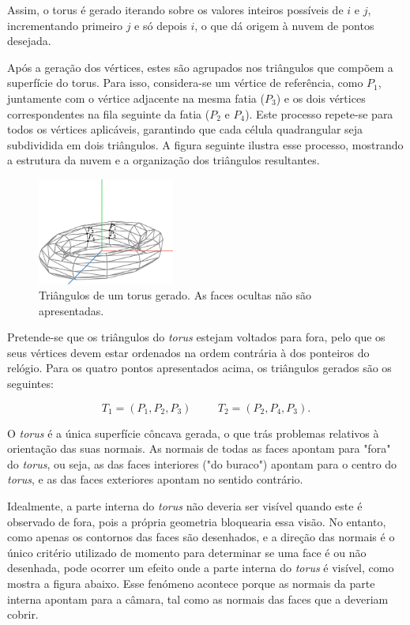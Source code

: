 \documentclass[12pt, a4paper]{article}
\begin{document}
Assim, o torus é gerado iterando sobre os valores inteiros possíveis de $i$ e $j$, incrementando
primeiro $j$ e só depois $i$, o que dá origem à nuvem de pontos desejada.

Após a geração dos vértices, estes são agrupados nos triângulos que compõem a superfície do torus.
Para isso, considera-se um vértice de referência, como $P_1$, juntamente com o vértice adjacente
na mesma fatia ($P_3$) e os dois vértices correspondentes na fila seguinte da fatia ($P_2$ e
$P_4$).
Este processo repete-se para todos os vértices aplicáveis, garantindo que cada célula quadrangular
seja subdividida em dois triângulos. A figura seguinte ilustra esse processo, mostrando a estrutura
da nuvem e a organização dos triângulos resultantes.

\begin{figure}[H]
    \centering
    \includegraphics[width=0.4\textwidth]{res/figures/TorusTriangle.pdf}
    \caption{Triângulos de um torus gerado. As faces ocultas não são apresentadas.}
\end{figure}

Pretende-se que os triângulos do \emph{torus} estejam voltados para fora, pelo que os seus vértices
devem estar ordenados na ordem contrária à dos ponteiros do relógio. Para os quatro pontos
apresentados acima, os triângulos gerados são os seguintes:

$$
T_1 = (P_1, P_2, P_3)
\hspace{1cm}
T_2 = (P_2, P_4, P_3).
$$

O \emph{torus} é a única superfície côncava gerada, o que trás problemas relativos à orientação das
suas normais. As normais de todas as faces apontam para "fora"{} do \emph{torus}, ou seja, as das
faces interiores ("do buraco"{}) apontam para o centro do \emph{torus}, e as das faces exteriores
apontam no sentido contrário.

Idealmente, a parte interna do \emph{torus} não deveria ser visível quando este é observado de fora,
pois a própria geometria bloquearia essa visão. No entanto, como apenas os contornos das faces são
desenhados, e a direção das normais é o único critério utilizado de momento para determinar se uma
face é ou não desenhada, pode ocorrer um efeito onde a parte interna do \emph{torus} é visível, como
mostra a figura abaixo. Esse fenómeno acontece porque as normais da parte interna apontam para a
câmara, tal como as normais das faces que a deveriam cobrir.
\end{document}
